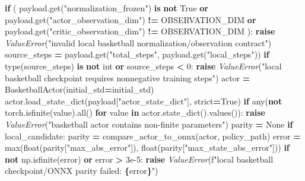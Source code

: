 \documentclass[
  american,
  11pt,
  letterpaper,
]{article}
\newenvironment{Shaded}{\begin{snugshade}}{\end{snugshade}}
\newcommand{\BuiltInTok}[1]{#1}
\newcommand{\ControlFlowTok}[1]{\textcolor[rgb]{0.13,0.29,0.53}{\textbf{#1}}}
\newcommand{\DecValTok}[1]{\textcolor[rgb]{0.00,0.00,0.81}{#1}}
\newcommand{\FloatTok}[1]{\textcolor[rgb]{0.00,0.00,0.81}{#1}}
\newcommand{\KeywordTok}[1]{\textcolor[rgb]{0.13,0.29,0.53}{\textbf{#1}}}
\newcommand{\NormalTok}[1]{#1}
\newcommand{\OperatorTok}[1]{\textcolor[rgb]{0.81,0.36,0.00}{\textbf{#1}}}
\newcommand{\PreprocessorTok}[1]{\textcolor[rgb]{0.56,0.35,0.01}{\textit{#1}}}
\newcommand{\SpecialCharTok}[1]{\textcolor[rgb]{0.81,0.36,0.00}{\textbf{#1}}}
\newcommand{\SpecialStringTok}[1]{\textcolor[rgb]{0.31,0.60,0.02}{#1}}
\newcommand{\StringTok}[1]{\textcolor[rgb]{0.31,0.60,0.02}{#1}}
\newcommand{\VariableTok}[1]{\textcolor[rgb]{0.00,0.00,0.00}{#1}}
\renewenvironment{Shaded}{\par\smallskip}{\par\smallskip}
\begin{document}
\begin{Shaded}
\begin{Highlighting}[]
        \ControlFlowTok{if}\NormalTok{ (}
\NormalTok{            payload.get(}\StringTok{"normalization\_frozen"}\NormalTok{) }\KeywordTok{is} \KeywordTok{not} \VariableTok{True}
            \KeywordTok{or}\NormalTok{ payload.get(}\StringTok{"actor\_observation\_dim"}\NormalTok{) }\OperatorTok{!=}\NormalTok{ OBSERVATION\_DIM}
            \KeywordTok{or}\NormalTok{ payload.get(}\StringTok{"critic\_observation\_dim"}\NormalTok{) }\OperatorTok{!=}\NormalTok{ OBSERVATION\_DIM}
\NormalTok{        ):}
            \ControlFlowTok{raise} \PreprocessorTok{ValueError}\NormalTok{(}\StringTok{"invalid local basketball normalization/observation contract"}\NormalTok{)}
\NormalTok{        source\_steps }\OperatorTok{=}\NormalTok{ payload.get(}\StringTok{"total\_steps"}\NormalTok{, payload.get(}\StringTok{"local\_steps"}\NormalTok{))}
        \ControlFlowTok{if} \BuiltInTok{type}\NormalTok{(source\_steps) }\KeywordTok{is} \KeywordTok{not} \BuiltInTok{int} \KeywordTok{or}\NormalTok{ source\_steps }\OperatorTok{\textless{}} \DecValTok{0}\NormalTok{:}
            \ControlFlowTok{raise} \PreprocessorTok{ValueError}\NormalTok{(}\StringTok{"local basketball checkpoint requires nonnegative training steps"}\NormalTok{)}
\NormalTok{    actor }\OperatorTok{=}\NormalTok{ BasketballActor(initial\_std}\OperatorTok{=}\NormalTok{initial\_std)}
\NormalTok{    actor.load\_state\_dict(payload[}\StringTok{"actor\_state\_dict"}\NormalTok{], strict}\OperatorTok{=}\VariableTok{True}\NormalTok{)}
    \ControlFlowTok{if} \BuiltInTok{any}\NormalTok{(}\KeywordTok{not}\NormalTok{ torch.isfinite(value).}\BuiltInTok{all}\NormalTok{() }\ControlFlowTok{for}\NormalTok{ value }\KeywordTok{in}\NormalTok{ actor.state\_dict().values()):}
        \ControlFlowTok{raise} \PreprocessorTok{ValueError}\NormalTok{(}\StringTok{"basketball actor contains non{-}finite parameters"}\NormalTok{)}
\NormalTok{    parity }\OperatorTok{=} \VariableTok{None}
    \ControlFlowTok{if}\NormalTok{ local\_candidate:}
\NormalTok{        parity }\OperatorTok{=}\NormalTok{ compare\_actor\_to\_onnx(actor, policy\_path)}
\NormalTok{        error }\OperatorTok{=} \BuiltInTok{max}\NormalTok{(}\BuiltInTok{float}\NormalTok{(parity[}\StringTok{"max\_abs\_error"}\NormalTok{]), }\BuiltInTok{float}\NormalTok{(parity[}\StringTok{"max\_state\_abs\_error"}\NormalTok{]))}
        \ControlFlowTok{if} \KeywordTok{not}\NormalTok{ np.isfinite(error) }\KeywordTok{or}\NormalTok{ error }\OperatorTok{\textgreater{}} \FloatTok{3e{-}5}\NormalTok{:}
            \ControlFlowTok{raise} \PreprocessorTok{ValueError}\NormalTok{(}\SpecialStringTok{f"local basketball checkpoint/ONNX parity failed: }\SpecialCharTok{\{}\NormalTok{error}\SpecialCharTok{\}}\SpecialStringTok{"}\NormalTok{)}

\end{Highlighting}
\end{Shaded}
\end{document}
